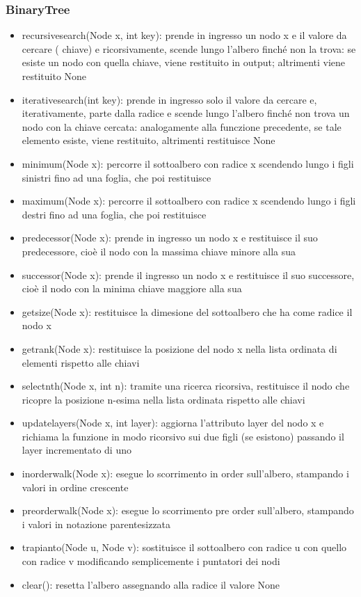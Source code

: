 \documentclass[a4paper,12pt]{article}
\begin{document}
    \subsubsection{BinaryTree}
    \begin{itemize}
        \item recursive\textunderscore search(Node x, int key): prende in ingresso un nodo x e il valore da cercare (
        chiave) e ricorsivamente, scende lungo l'albero finché non la trova: se esiste un nodo con quella chiave,
        viene restituito in output; altrimenti viene restituito None
        \item iterative\textunderscore search(int key): prende in ingresso solo il valore da cercare e,
        iterativamente, parte dalla radice e scende lungo l'albero finché non trova un nodo con la chiave cercata:
        analogamente alla funczione precedente, se tale elemento esiste, viene restituito, altrimenti restituisce None
        \item minimum(Node x): percorre il sottoalbero con radice x scendendo lungo i figli sinistri fino ad una
        foglia, che poi restituisce
        \item maximum(Node x): percorre il sottoalbero con radice x scendendo lungo i figli destri fino ad una
        foglia, che poi restituisce
        \item predecessor(Node x): prende in ingresso un nodo x e restituisce il suo predecessore, cioè il nodo con
        la massima chiave minore alla sua
        \item successor(Node x): prende il ingresso un nodo x e restituisce il suo successore, cioè il nodo con la
        minima chiave maggiore alla sua
        \item get\textunderscore size(Node x): restituisce la dimesione del sottoalbero che ha come radice il nodo x
        \item get\textunderscore rank(Node x): restituisce la posizione del nodo x nella lista ordinata di elementi
        rispetto alle chiavi
        \item select\textunderscore nth(Node x, int n): tramite una ricerca ricorsiva, restituisce il nodo che
        ricopre la posizione n-esima nella lista ordinata rispetto alle chiavi
        \item update\textunderscore layers(Node x, int layer): aggiorna l'attributo
        layer del nodo x e richiama la funzione in modo ricorsivo sui due figli (se esistono) passando il layer
        incrementato di uno
        \item inorder\textunderscore walk(Node x): esegue lo scorrimento in order sull'albero, stampando i valori in
        ordine crescente
        \item preorder\textunderscore walk(Node x): esegue lo scorrimento pre order sull'albero, stampando i valori
        in notazione parentesizzata
        \item trapianto(Node u, Node v): sostituisce il sottoalbero con radice u con quello con radice v modificando
        semplicemente i puntatori dei nodi
        \item clear(): resetta l'albero assegnando alla radice il valore None
    \end{itemize}
\end{document}

